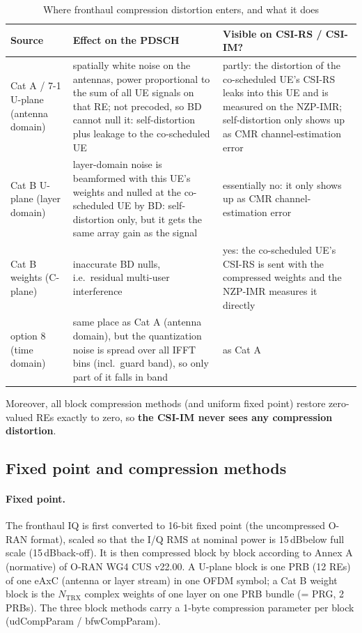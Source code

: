 \documentclass[11pt,a4paper]{article}
\newcommand{\dB}{\,dB}
\begin{document}
\begin{table}[H]
\centering
\caption{Where fronthaul compression distortion enters, and what it does}
\label{tab:inject}
\footnotesize
\begin{tabularx}{\textwidth}{@{}P{2.7cm} Y Y@{}}
\toprule
Source & Effect on the PDSCH & Visible on CSI-RS / CSI-IM? \\
\midrule
Cat A / 7-1 U-plane (antenna domain)
  & spatially white noise on the antennas, power proportional to the sum of all UE signals on that RE; not precoded, so BD
    cannot null it: self-distortion plus leakage to the co-scheduled UE
  & partly: the distortion of the co-scheduled UE's CSI-RS leaks into this UE and is measured on the NZP-IMR; self-distortion
    only shows up as CMR channel-estimation error \\
Cat B U-plane (layer domain)
  & layer-domain noise is beamformed with this UE's weights and nulled at the co-scheduled UE by BD: self-distortion only,
    but it gets the same array gain as the signal
  & essentially no: it only shows up as CMR channel-estimation error \\
Cat B weights (C-plane)
  & inaccurate BD nulls, i.e.\ residual multi-user interference
  & yes: the co-scheduled UE's CSI-RS is sent with the compressed weights and the NZP-IMR measures it directly \\
option 8 (time domain)
  & same place as Cat A (antenna domain), but the quantization noise is spread over all IFFT bins (incl.\ guard band), so only
    part of it falls in band
  & as Cat A \\
\bottomrule
\end{tabularx}
\end{table}

Moreover, all block compression methods (and uniform fixed point) restore zero-valued REs exactly to zero, so \textbf{the
CSI-IM never sees any compression distortion}.

\subsection{Fixed point and compression methods}

\paragraph{Fixed point.} The fronthaul IQ is first converted to 16-bit fixed point (the uncompressed O-RAN format), scaled so
that the I/Q RMS at nominal power is 15\dB below full scale (15\dB back-off). It is then compressed block by block according
to Annex A (normative) of O-RAN WG4 CUS v22.00. A U-plane block is one PRB (12 REs) of one eAxC (antenna or layer stream) in
one OFDM symbol; a Cat B weight block is the $N_{\mathrm{TRX}}$ complex weights of one layer on one PRB bundle (= PRG, 2 PRBs).
The three block methods carry a 1-byte compression parameter per block (udCompParam / bfwCompParam).
\end{document}
